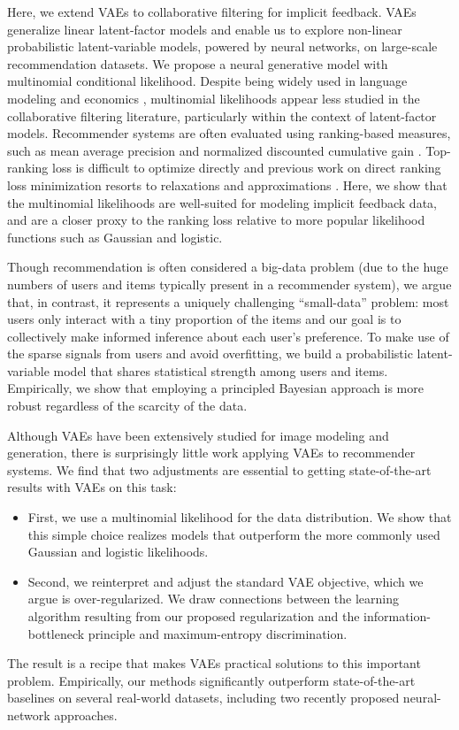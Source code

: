 \documentclass[sigconf]{acmart}
\begin{document}
Here, we extend \glspl{VAE} \citep{kingma2013auto,rezende2014stochastic}
to collaborative filtering for implicit feedback. \Glspl{VAE} generalize linear latent-factor models and enable us to
explore non-linear probabilistic latent-variable models, powered by neural networks, on large-scale recommendation datasets. 
We propose a neural generative model with multinomial conditional likelihood. Despite being widely used in language
modeling and economics \citep{blei2003latent,mcfadden1973conditional}, multinomial likelihoods appear
less studied in the collaborative filtering literature, particularly within the context of latent-factor models.
Recommender systems are often evaluated using ranking-based measures, such as mean 
average precision and normalized discounted cumulative gain \citep{jarvelin2002cumulated}. 
Top- ranking loss is difficult to optimize directly and previous work on direct ranking 
loss minimization resorts to relaxations and approximations \citep{weimer2008cofi,weston2011wsabie}.  
Here, we show that the multinomial likelihoods are well-suited for modeling implicit feedback data, and are a closer proxy to the ranking 
loss relative to more popular likelihood functions such as Gaussian and logistic. 

Though recommendation is often considered a big-data problem (due to the huge numbers of users
and items typically present in a recommender system), we argue that, in contrast, it represents a uniquely 
challenging ``small-data'' problem: most users only interact with a tiny proportion of the items 
and our goal is to collectively make informed inference about each user's preference. To make use of the sparse 
signals from users and avoid overfitting, we build a probabilistic latent-variable model that shares 
statistical strength among users and items. Empirically, we show that employing a 
principled Bayesian approach is more robust regardless of the scarcity of the data.

Although \glspl{VAE} have been extensively studied for image modeling and generation,
there is surprisingly little work applying \glspl{VAE} to recommender systems.
We find that two adjustments are essential to getting state-of-the-art results with \glspl{VAE} on this task:
\begin{itemize}
\item First, we use a multinomial likelihood for the data distribution. We show that this simple choice
realizes models that outperform the more commonly used Gaussian and logistic likelihoods.
\item Second, we reinterpret and adjust the standard \gls{VAE} objective, which we argue is over-regularized.
We draw connections between the learning algorithm resulting from our proposed regularization 
and the information-bottleneck principle and maximum-entropy discrimination. 
\end{itemize}
The result is a recipe that makes \glspl{VAE} practical solutions to this important problem.
Empirically, our methods significantly outperform 
state-of-the-art baselines on several real-world datasets, including
two recently proposed neural-network approaches.
 
\end{document}
